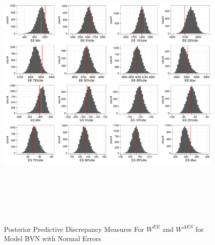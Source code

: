 \documentclass[11pt]{article}\usepackage[]{graphicx}\usepackage[]{color}
\begin{document}
  \begin{figure}
  \centering
  \includegraphics[width=17cm,height=15cm]{manual_figure/wpwdiagbvn.pdf}
  \caption{Posterior Predictive Discrepancy Measures For $W^{EE}$ and $W^{\Delta ES}$ for Model BVN with Normal Errors}
  \label{wpwdiagbvn}
  \end{figure}
\end{document}
